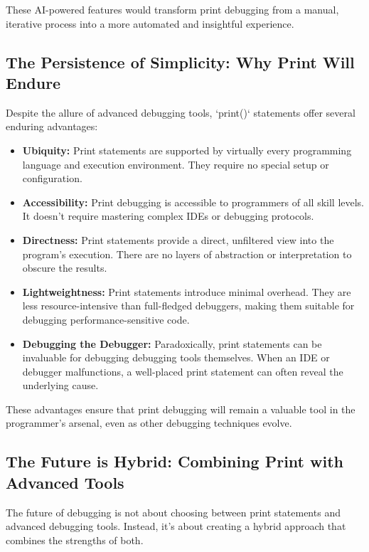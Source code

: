 \documentclass{article}
\begin{document}
{{{{These AI-powered features would transform print debugging from a manual, iterative process into a more automated and insightful experience.

\subsection*{The Persistence of Simplicity: Why Print Will Endure}

Despite the allure of advanced debugging tools, `print()` statements offer several enduring advantages:

\begin{itemize}
    \item \textbf{Ubiquity:} Print statements are supported by virtually every programming language and execution environment. They require no special setup or configuration.
    \item \textbf{Accessibility:}  Print debugging is accessible to programmers of all skill levels.  It doesn't require mastering complex IDEs or debugging protocols.
    \item \textbf{Directness:} Print statements provide a direct, unfiltered view into the program's execution.  There are no layers of abstraction or interpretation to obscure the results.
    \item \textbf{Lightweightness:} Print statements introduce minimal overhead.  They are less resource-intensive than full-fledged debuggers, making them suitable for debugging performance-sensitive code.
    \item \textbf{Debugging the Debugger:} Paradoxically, print statements can be invaluable for debugging debugging tools themselves. When an IDE or debugger malfunctions, a well-placed print statement can often reveal the underlying cause.
\end{itemize}

These advantages ensure that print debugging will remain a valuable tool in the programmer's arsenal, even as other debugging techniques evolve.

\subsection*{The Future is Hybrid: Combining Print with Advanced Tools}

The future of debugging is not about choosing between print statements and advanced debugging tools.  Instead, it's about creating a hybrid approach that combines the strengths of both.

}}}}
\end{document}
